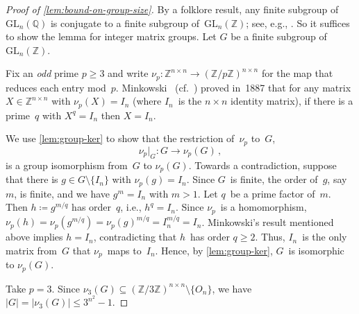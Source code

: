 \documentclass{lmcs}
\theoremstyle{definition}
\newcommand{\GL}{\mathrm{GL}}
\newcommand{\Q}{\mathbb{Q}}
\newcommand{\Z}{\mathbb{Z}}
\begin{document}
\begin{proof}[Proof of \cref{lem:bound-on-group-size}]
By a folklore result, any finite subgroup of~$\GL_n(\Q)$ is conjugate to a finite subgroup of~$\GL_n(\Z)$; see, e.g., \cite[Theorem~1.6]{KuzmanovichPavlichenkov02}.
So it suffices to show the lemma for integer matrix groups.
Let $G$ be a finite subgroup of~$\GL_n(\Z)$.

Fix an \emph{odd} prime $p \ge 3$ and write $\nu_p : \Z^{n \times n} \to (\Z/p \Z)^{n \times n}$ for the map that reduces each entry mod~$p$.
Minkowski~\cite{Minkowski87} (cf.~\cite[Proposition~1.3]{KuzmanovichPavlichenkov02}) proved in~1887 that for any matrix $X \in \Z^{n \times n}$ with $\nu_p(X) = I_n$ (where $I_n$~is the $n \times n$ identity matrix), if there is a prime~$q$ with $X^q = I_n$ then $X = I_n$.

We use \cref{lem:group-ker} to show that the restriction of~$\nu_p$ to~$G$,
\[
 \nu_p|_G: G \to \nu_p(G)\,,
\]
is a group isomorphism from~$G$ to $\nu_p(G)$.
Towards a contradiction, suppose that there is $g \in G \setminus \{I_n\}$ with $\nu_p(g) = I_n$.
Since $G$~is finite, the order of~$g$, say~$m$, is finite, and we have $g^m = I_n$ with $m > 1$.
Let $q$~be a prime factor of~$m$.
Then $h \coloneqq g^{m/q}$ has order~$q$, i.e., $h^q = I_n$.
Since $\nu_p$~is a homomorphism, $\nu_p(h) = \nu_p(g^{m/q}) = \nu_p(g)^{m/q} = I_n^{m/q} = I_n$.
Minkowski's result mentioned above implies $h = I_n$, contradicting that $h$~has order $q \ge 2$.
Thus, $I_n$~is the only matrix from~$G$ that $\nu_p$~maps to~$I_n$.
Hence, by \cref{lem:group-ker}, $G$~is isomorphic to $\nu_p(G)$.

Take $p=3$.
Since $\nu_3(G) \subseteq (\Z/3\Z)^{n \times n} \setminus \{O_n\}$, we have $|G| = |\nu_3(G)| \le 3^{n^2}-1$.
\end{proof}


\end{document}
